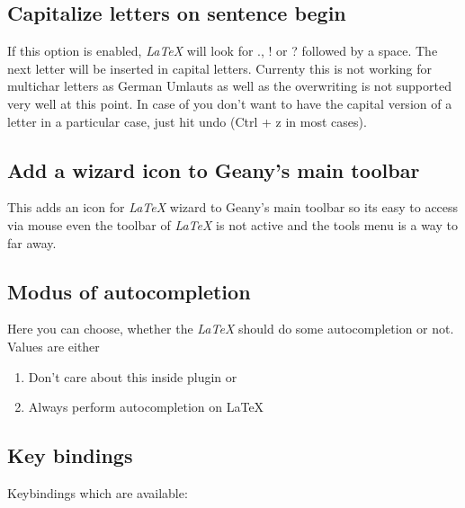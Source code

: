 \documentclass[%
paper=a4,%
fontsize=11pt,%
twoside=false,%
DIV18,%
headsepline,%
plainheadsepline,%
footsepline,%
plainfootsepline,%
bibliography=totoc,%
listof=totoc,%
BCOR10mm,%
parskip=half,%
openany,%
]{scrreprt}
\begin{document}
\subsection{Capitalize letters on sentence begin}

If this option is enabled, \textit{LaTeX} will look for \textsc{.},
\textsc{!} or \textsc{?} followed by a space. The next letter will
be inserted in capital letters. Currenty this is not working for
multichar letters as German Umlauts as well as the overwriting is
not supported very well at this point. In case of you don't want to
have the capital version of a letter in a particular case, just hit
undo (Ctrl + z in most cases).

\subsection{Add a wizard icon to Geany's main toolbar}
This adds an icon for \textit{LaTeX} wizard to Geany's main toolbar
so its easy to access via mouse even the toolbar of \textit{LaTeX} is
not active and the tools menu is a way to far away.

\subsection{Modus of autocompletion}
\label{sec:modus_of_autocompletion}
Here you can choose, whether the \textit{LaTeX} should do some
autocompletion or not. Values are either
\begin{enumerate}
    \item Don't care about this inside plugin or
    \item Always perform autocompletion on LaTeX
\end{enumerate}

\subsection{Key bindings}
\label{sec:key_bindings}
Keybindings which are available:
\end{document}
